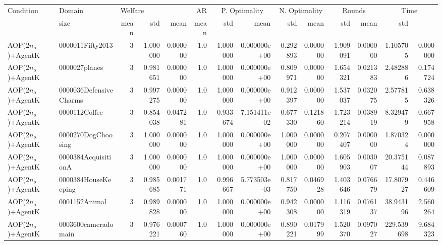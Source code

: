 \begin{tabular}{llrr|r|rr|rr|rr|rrr}
\toprule
                Condition &                 Domain & \multicolumn{3}{l}{Welfare} &   AR & \multicolumn{2}{c}{P. Optimality} & \multicolumn{2}{c}{N. Optimality} & \multicolumn{2}{c}{Rounds} & \multicolumn{2}{c}{Time} \\
                          &    size &     mean &      std & mean &          mean &          std &          mean &      std &          mean &         std &         mean &         std \\
\midrule
      AOP($2 n_o$)+AgentK &       0000011Fifty2013 &       3 & 1.000000 & 0.000000 &  1.0 &      1.000000 & 0.000000e+00 &      0.292893 & 0.000000 &      1.909091 &    0.000000 &     1.105705 &    0.000000 \\
      AOP($2 n_o$)+AgentK &          0000027planes &       3 & 0.981651 & 0.000000 &  1.0 &      1.000000 & 0.000000e+00 &      0.809971 & 0.000000 &      1.654321 &    0.021383 &     2.482886 &    0.174724 \\
      AOP($2 n_o$)+AgentK & 0000036DefensiveCharms &       3 & 0.997275 & 0.000000 &  1.0 &      1.000000 & 0.000000e+00 &      0.912397 & 0.000000 &      1.537037 &    0.032075 &     2.577815 &    0.638326 \\
      AOP($2 n_o$)+AgentK &          0000112Coffee &       3 & 0.854038 & 0.047281 &  1.0 &      0.933674 & 7.151411e-02 &      0.677330 & 0.121860 &      1.723214 &    0.038919 &     8.329479 &    0.667958 \\
      AOP($2 n_o$)+AgentK &     0000270DogChoosing &       3 & 1.000000 & 0.000000 &  1.0 &      1.000000 & 0.000000e+00 &      1.000000 & 0.000000 &      0.207407 &    0.000000 &     1.870324 &    0.000000 \\
      AOP($2 n_o$)+AgentK &    0000384AcquisitionA &       3 & 1.000000 & 0.000000 &  1.0 &      1.000000 & 0.000000e+00 &      1.000000 & 0.000000 &      1.605903 &    0.003007 &    20.375144 &    0.087893 \\
      AOP($2 n_o$)+AgentK &    0000384HouseKeeping &       3 & 0.985685 & 0.001771 &  1.0 &      0.996667 & 5.773503e-03 &      0.817750 & 0.046928 &      1.403646 &    0.076679 &    17.807927 &    0.446609 \\
      AOP($2 n_o$)+AgentK &          0001152Animal &       3 & 0.989828 & 0.000000 &  1.0 &      1.000000 & 0.000000e+00 &      0.942308 & 0.000000 &      1.116319 &    0.076137 &    38.943196 &    2.560264 \\
      AOP($2 n_o$)+AgentK &    0003600cameradomain &       3 & 0.976221 & 0.000760 &  1.0 &      1.000000 & 0.000000e+00 &      0.890221 & 0.017999 &      1.520370 &    0.097027 &   229.539698 &    9.684323 \\

\end{tabular}
